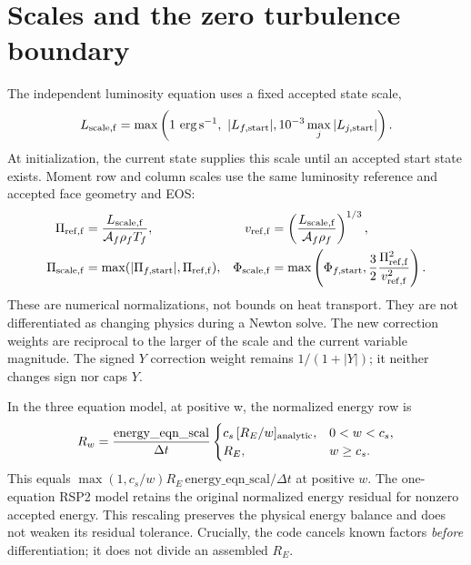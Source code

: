 \documentclass[11pt]{article}
\newcommand{\area}{\mathcal A}
\numberwithin{equation}{section}
\begin{document}
\clearpage
\section{Scales and the zero turbulence boundary}
\label{sec:numerics}
The independent luminosity equation uses a fixed accepted state scale,
\begin{equation}
 L_{\rm scale,f}=
 \max\left(1\ {\rm erg\,s^{-1}},\ |L_{f,\rm start}|,
                   10^{-3}\max_j|L_{j,\rm start}|\right).
\end{equation}
At initialization, the current state supplies this scale until an accepted
start state exists. Moment row and column scales use the same luminosity
reference and accepted face geometry and EOS:
\begin{align}
 \Pi_{\rm ref,f}&=\frac{L_{\rm scale,f}}{\area_f\rho_fT_f},
 &v_{\rm ref,f}&=\left(\frac{L_{\rm scale,f}}{\area_f\rho_f}\right)^{1/3},\\
 \Pi_{\rm scale,f}&=\max(|\Pi_{f,\rm start}|,\Pi_{\rm ref,f}),
 &\Phi_{\rm scale,f}&=\max\left(\Phi_{f,\rm start},
                     \frac32\frac{\Pi_{\rm ref,f}^2}{v_{\rm ref,f}^2}\right).
\end{align}
These are numerical normalizations, not bounds on heat transport.
They are not differentiated as changing physics during a Newton solve.
The new correction weights are reciprocal to the larger of the scale and
the current variable magnitude. The signed $Y$ correction weight remains
$1/(1+|Y|)$; it neither changes sign nor caps $Y$.

In the three equation model, at positive w,
the normalized energy row is
\begin{equation}
 R_w=\frac{\mathrm{energy\_eqn\_scal}}{\Delta t}
 \begin{cases}
 c_s\,[R_E/w]_{\rm analytic},&0<w<c_s,\\
 R_E,&w\geq c_s.
 \end{cases}
 \label{eq:wscale}
\end{equation}
This equals $\max(1,c_s/w)R_E\,\mathrm{energy\_eqn\_scal}/\Delta t$
at positive $w$. The one-equation RSP2 model retains the original normalized
energy residual for nonzero accepted energy. This rescaling preserves the
physical energy balance and does not
weaken its residual tolerance. Crucially, the code cancels known factors
\emph{before} differentiation; it does not divide an assembled $R_E$.
\end{document}
